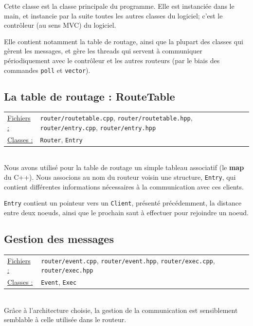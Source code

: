 \documentclass[a4paper,11pt]{article}
\begin{document}
Cette classe est la classe principale du programme. Elle est instanciée dans le main, et instancie par la suite toutes les autres
classes du logiciel; c'est le contrôleur (au sens MVC) du logiciel.

Elle contient notamment la table de routage, ainsi que la plupart des classes qui gèrent les messages, et gère les threads
qui servent à communiquer périodiquement avec le contrôleur et les autres routeurs (par le biais des commandes \texttt{poll} et \texttt{vector}).

\subsection{La table de routage : RouteTable}

\begin{tabularx}{\linewidth}{lX}
\underline{Fichiers :} & \texttt{router/routetable.cpp}, \texttt{router/routetable.hpp}, \texttt{router/entry.cpp}, \texttt{router/entry.hpp}\\
\underline{Classes :} & \texttt{Router}, \texttt{Entry}\\
\end{tabularx}\\

Nous avons utilisé pour la table de routage un simple tableau associatif (le \textbf{map} du C++).
Nous associons au nom du routeur voisin une structure, \texttt{Entry}, qui contient différentes informations nécessaires
à la communication avec ces clients.

\texttt{Entry} contient un pointeur vers un \texttt{Client}, présenté précédemment, la distance entre deux noeuds, ainsi que
le prochain saut à effectuer pour rejoindre un noeud.

\subsection{Gestion des messages}

\begin{tabularx}{\linewidth}{lX}
\underline{Fichiers :} & \texttt{router/event.cpp}, \texttt{router/event.hpp}, \texttt{router/exec.cpp}, \texttt{router/exec.hpp}\\
\underline{Classes :} & \texttt{Event}, \texttt{Exec}\\
\end{tabularx}\\

Grâce à l'architecture choisie, la gestion de la communication est sensiblement semblable à celle utilisée dans le
routeur.
\end{document}
